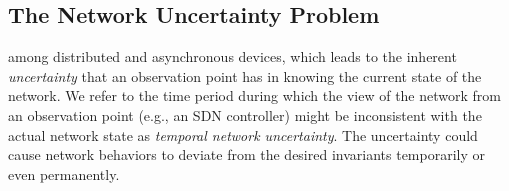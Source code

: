 

\subsection{The Network Uncertainty Problem}
\label{sec:uncertainty}

 among distributed and asynchronous devices,
which leads to the inherent \emph{uncertainty} that an observation point
has in knowing the current state of the network. %
We refer to the time period during which the view of the network from an observation point (e.g., an SDN controller)
might be inconsistent with the actual network state as {\em temporal network uncertainty}.
The uncertainty could cause network behaviors to deviate from the desired invariants 
temporarily or even permanently. 

